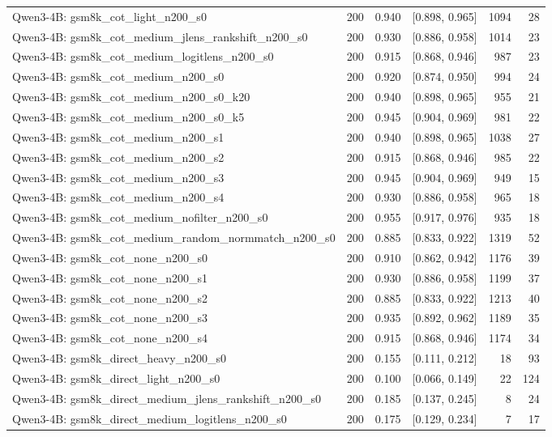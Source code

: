 \begin{tabular}{lrrrrr}
Qwen3-4B: gsm8k\_cot\_light\_n200\_s0 & 200 & 0.940 & [0.898, 0.965] & 1094 & 28 \\
Qwen3-4B: gsm8k\_cot\_medium\_jlens\_rankshift\_n200\_s0 & 200 & 0.930 & [0.886, 0.958] & 1014 & 23 \\
Qwen3-4B: gsm8k\_cot\_medium\_logitlens\_n200\_s0 & 200 & 0.915 & [0.868, 0.946] & 987 & 23 \\
Qwen3-4B: gsm8k\_cot\_medium\_n200\_s0 & 200 & 0.920 & [0.874, 0.950] & 994 & 24 \\
Qwen3-4B: gsm8k\_cot\_medium\_n200\_s0\_k20 & 200 & 0.940 & [0.898, 0.965] & 955 & 21 \\
Qwen3-4B: gsm8k\_cot\_medium\_n200\_s0\_k5 & 200 & 0.945 & [0.904, 0.969] & 981 & 22 \\
Qwen3-4B: gsm8k\_cot\_medium\_n200\_s1 & 200 & 0.940 & [0.898, 0.965] & 1038 & 27 \\
Qwen3-4B: gsm8k\_cot\_medium\_n200\_s2 & 200 & 0.915 & [0.868, 0.946] & 985 & 22 \\
Qwen3-4B: gsm8k\_cot\_medium\_n200\_s3 & 200 & 0.945 & [0.904, 0.969] & 949 & 15 \\
Qwen3-4B: gsm8k\_cot\_medium\_n200\_s4 & 200 & 0.930 & [0.886, 0.958] & 965 & 18 \\
Qwen3-4B: gsm8k\_cot\_medium\_nofilter\_n200\_s0 & 200 & 0.955 & [0.917, 0.976] & 935 & 18 \\
Qwen3-4B: gsm8k\_cot\_medium\_random\_normmatch\_n200\_s0 & 200 & 0.885 & [0.833, 0.922] & 1319 & 52 \\
Qwen3-4B: gsm8k\_cot\_none\_n200\_s0 & 200 & 0.910 & [0.862, 0.942] & 1176 & 39 \\
Qwen3-4B: gsm8k\_cot\_none\_n200\_s1 & 200 & 0.930 & [0.886, 0.958] & 1199 & 37 \\
Qwen3-4B: gsm8k\_cot\_none\_n200\_s2 & 200 & 0.885 & [0.833, 0.922] & 1213 & 40 \\
Qwen3-4B: gsm8k\_cot\_none\_n200\_s3 & 200 & 0.935 & [0.892, 0.962] & 1189 & 35 \\
Qwen3-4B: gsm8k\_cot\_none\_n200\_s4 & 200 & 0.915 & [0.868, 0.946] & 1174 & 34 \\
Qwen3-4B: gsm8k\_direct\_heavy\_n200\_s0 & 200 & 0.155 & [0.111, 0.212] & 18 & 93 \\
Qwen3-4B: gsm8k\_direct\_light\_n200\_s0 & 200 & 0.100 & [0.066, 0.149] & 22 & 124 \\
Qwen3-4B: gsm8k\_direct\_medium\_jlens\_rankshift\_n200\_s0 & 200 & 0.185 & [0.137, 0.245] & 8 & 24 \\
Qwen3-4B: gsm8k\_direct\_medium\_logitlens\_n200\_s0 & 200 & 0.175 & [0.129, 0.234] & 7 & 17 \\

\end{tabular}
